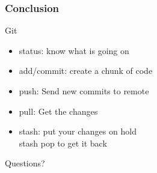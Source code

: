 \documentclass{beamer}
\begin{document}
\begin{frame}
	\frametitle{Conclusion}
	Git
	\begin{itemize}
	\item status: know what is going on
	\item add/commit: create a chunk of code
	\item push: Send new commits to remote
	\item pull: Get the changes
	\item stash: put your changes on hold\\stash pop to get it back
\end{itemize}
\end{frame}


\begin{frame}
\Huge{\centerline{Questions?}}
\end{frame}

\end{document}
